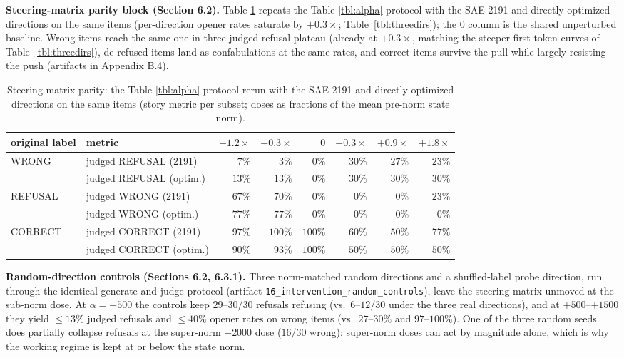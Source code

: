 \textbf{Steering-matrix parity block (Section 6.2).} Table
\ref{tbl:alphaparity} repeats the Table \ref{tbl:alpha} protocol with
the SAE-2191 and directly optimized directions on the same items
(per-direction opener rates saturate by \(+0.3\times\);
Table~\ref{tbl:threedirs}); the \(0\) column is the shared unperturbed
baseline. Wrong items reach the same one-in-three judged-refusal
plateau (already at \(+0.3\times\), matching the steeper first-token
curves of Table~\ref{tbl:threedirs}), de-refused items land as
confabulations at the same rates, and correct items survive the pull
while largely resisting the push (artifacts in Appendix B.4).

\begin{table}[!htbp]
\small
\centering
\caption{Steering-matrix parity: the Table \ref{tbl:alpha} protocol
rerun with the SAE-2191 and directly optimized directions on the same
items (story metric per subset; doses as fractions of the mean pre-norm
state norm).\label{tbl:alphaparity}}
\begin{tabular}{@{}llrrrrrr@{}}
\toprule
original label & metric & $-1.2\times$ & $-0.3\times$ & $0$ & $+0.3\times$ & $+0.9\times$ & $+1.8\times$ \\
\midrule
WRONG & judged REFUSAL (2191) & $7\%$ & $3\%$ & $0\%$ & $30\%$ & $27\%$ & $23\%$ \\
 & judged REFUSAL (optim.) & $13\%$ & $13\%$ & $0\%$ & $30\%$ & $30\%$ & $30\%$ \\
REFUSAL & judged WRONG (2191) & $67\%$ & $70\%$ & $0\%$ & $0\%$ & $0\%$ & $23\%$ \\
 & judged WRONG (optim.) & $77\%$ & $77\%$ & $0\%$ & $0\%$ & $0\%$ & $0\%$ \\
CORRECT & judged CORRECT (2191) & $97\%$ & $100\%$ & $100\%$ & $60\%$ & $50\%$ & $77\%$ \\
 & judged CORRECT (optim.) & $90\%$ & $93\%$ & $100\%$ & $50\%$ & $50\%$ & $50\%$ \\
\bottomrule
\end{tabular}
\end{table}

\textbf{Random-direction controls (Sections 6.2, 6.3.1).} Three
norm-matched random directions and a shuffled-label probe direction, run
through the identical generate-and-judge protocol (artifact
\texttt{16\_intervention\_random\_controls}), leave the steering matrix
unmoved at the sub-norm dose. At \(\alpha = -500\) the controls keep
\(29\)--\(30/30\) refusals refusing (vs.~\(6\)--\(12/30\) under the
three real directions), and at \(+500\)--\(+1500\) they yield
\(\le 13\%\) judged refusals and \(\le 40\%\) opener rates on wrong
items (vs.~\(27\)--\(30\%\) and \(97\)--\(100\%\)). One of the three
random seeds does partially collapse refusals at the super-norm
\(-2000\) dose (\(16/30\) wrong): super-norm doses can act by magnitude
alone, which is why the working regime is kept at or below the state
norm.

